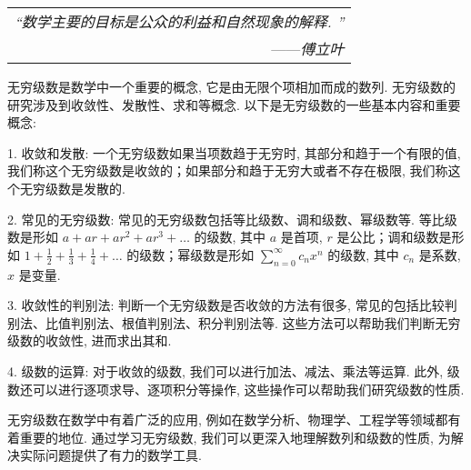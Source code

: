 \begin{flushright}
    \begin{tabular}{r|}
        \textit{“数学主要的目标是公众的利益和自然现象的解释. ”}\\
        ——\textit{傅立叶}
    \end{tabular}
\end{flushright}

无穷级数是数学中一个重要的概念, 它是由无限个项相加而成的数列. 无穷级数的研究涉及到收敛性、发散性、求和等概念. 以下是无穷级数的一些基本内容和重要概念: 

1. 收敛和发散: 一个无穷级数如果当项数趋于无穷时, 其部分和趋于一个有限的值, 我们称这个无穷级数是收敛的；如果部分和趋于无穷大或者不存在极限, 我们称这个无穷级数是发散的. 

2. 常见的无穷级数: 常见的无穷级数包括等比级数、调和级数、幂级数等. 等比级数是形如 $a + ar + ar^2 + ar^3 + \ldots$ 的级数, 其中 $a$ 是首项, $r$ 是公比；调和级数是形如 $\displaystyle 1 + \frac{1}{2} + \frac{1}{3} + \frac{1}{4} + \ldots$ 的级数；幂级数是形如 $\displaystyle \sum_{n=0}^{\infty} c_n x^n$ 的级数, 其中 $c_n$ 是系数, $x$ 是变量. 

3. 收敛性的判别法: 判断一个无穷级数是否收敛的方法有很多, 常见的包括比较判别法、比值判别法、根值判别法、积分判别法等. 这些方法可以帮助我们判断无穷级数的收敛性, 进而求出其和. 

4. 级数的运算: 对于收敛的级数, 我们可以进行加法、减法、乘法等运算. 此外, 级数还可以进行逐项求导、逐项积分等操作, 这些操作可以帮助我们研究级数的性质. 

无穷级数在数学中有着广泛的应用, 例如在数学分析、物理学、工程学等领域都有着重要的地位. 通过学习无穷级数, 我们可以更深入地理解数列和级数的性质, 为解决实际问题提供了有力的数学工具. 
